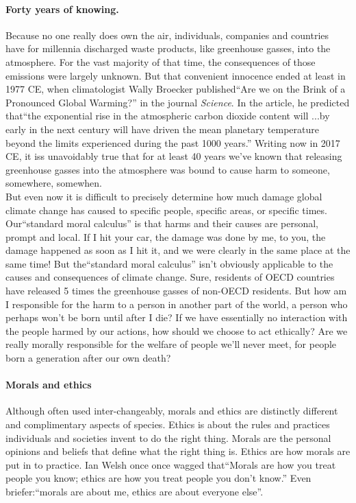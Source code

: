 \paragraph{Forty years of knowing.} Because no one really does own the air, individuals, companies and countries have for millennia discharged waste products, like greenhouse gasses, into the atmosphere. For the vast majority of that time, the consequences of those emissions were largely unknown. But that convenient innocence ended at least in 1977 CE, when climatologist Wally Broecker published``Are we on the Brink of a Pronounced Global Warming?'' in the journal \textit{Science}. In the article, he predicted that``the exponential rise in the atmospheric carbon dioxide content will ...by early in the next century will have driven the mean planetary temperature beyond the limits experienced during the past 1000 years.'' Writing now in 2017 CE, it iss unavoidably true that for at least 40 years we've known that releasing greenhouse gasses into the atmosphere was bound to cause harm to someone, somewhere, somewhen.\\

But even now it is difficult to precisely determine how much damage global climate change has caused to specific people, specific areas, or specific times. Our``standard moral calculus'' is that harms and their causes are personal, prompt and local. If I hit your car,  the damage was done by me, to you,  the damage happened as soon as I hit it, and we were clearly in the same place at the same time! But the``standard moral calculus'' isn't obviously applicable to the causes and consequences of climate change. Sure, residents of OECD countries have released 5 times the greenhouse gasses of non-OECD residents. But how am I responsible for the harm to a person in another part of the world, a person who perhaps won't be born until after I die? If we have essentially no interaction with the people harmed by our actions, how should we choose to act ethically? Are we really morally responsible for the welfare of people we'll never meet, for people born a generation after our own death?\\

\paragraph{Morals and ethics} Although often used inter-changeably, morals and ethics are distinctly different and complimentary aspects of species. Ethics is about the rules and practices individuals and societies invent to do the right thing. Morals are the personal opinions and beliefs that define what the right thing is. Ethics are how morals are put in to practice. Ian Welsh once once wagged that``Morals are how you treat people you know; ethics are how you treat people you don't know.'' Even briefer:``morals are about me, ethics are about everyone else''.\\

